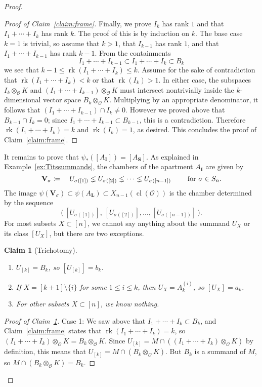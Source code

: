 \documentclass[11 pt]{article}
\theoremstyle{plain}
\newtheorem{claims}{Claim}
\theoremstyle{definition}
\numberwithin{equation}{section}
\renewcommand{\O}{\mathcal{O}}
\DeclareMathOperator{\class}{cl}
\newcommand\LL{\mathbf{L}}
\newcommand\II{\mathbf{I}}
\newcommand\VV{\mathbf{V}}
\newcommand\bS{\mathbf{S}}
\newcommand\coloneq{\mathrel{\mathop:}\mkern-1.2mu=}
\newcommand\tensor{\otimes}
\DeclareMathOperator{\Rank}{rk}
\newcommand{\change}{}
\begin{document}
\begin{proof}
\begin{proof}[Proof of Claim~\ref{claim:frame}]
Finally, we prove $I_k$ has rank $1$ and that $I_1 + \cdots + I_k$ has rank $k$.  The proof of this
is by induction on $k$.  The base case $k=1$ is trivial, so assume that $k>1$, that $I_{k-1}$ has rank $1$,
and that $I_1 + \cdots + I_{k-1}$ has rank $k-1$.
From the containments
\[I_1+\cdots+I_{k-1}\subset I_1+\cdots+I_k\subset B_k\]
we see that $k-1\leq \Rank(I_1+\cdots+I_k)\leq k$. Assume for the sake of contradiction that $\Rank(I_1+\cdots+I_k)<k$ 
or that $\Rank(I_k)>1$.  In either case, the subspaces  $I_k\tensor_\O K$ and $(I_1+\cdots+I_{k-1})\tensor_\O K$  must intersect nontrivially inside the $k$-dimensional vector space $B_k\tensor_\O K$. Multiplying by an appropriate denominator, it follows that $(I_1+\cdots+I_{k-1})\cap I_k\neq 0$. However we proved above that $B_{k-1}\cap I_k=0$; since $I_1+\cdots+I_{k-1}\subset B_{k-1}$, this is a contradiction. Therefore $\Rank(I_1+\cdots+I_k)=k$ and $\Rank(I_k)=1$, as desired. This concludes the proof of Claim~\ref{claim:frame}.
\end{proof}

It remains to prove that $\psi_{\ast}([A_{\II}]) = [A_{\bS}]$.  As explained in Example~\ref{ex:Titssummands},
the chambers of the apartment $A_\II$ are given by
\[\VV_\sigma\coloneq\quad U_{\sigma([1])}\lneq U_{\sigma([2])}\lneq\cdots\lneq U_{\sigma([n-1])}\qquad\text{ for }\sigma\in S_n.\]
The image $\psi(\VV_\sigma)\subset \psi(A_\LL)\subset X_{n-1}(\class(\O))$ is the 
chamber determined by the sequence
\[\big(\,[U_{\sigma([1])}],\,[U_{\sigma([2])}],\ldots,[U_{\sigma([n-1])}]\,\big).\]%
For most subsets $X\subset [n]$, we cannot say anything about the summand $U_X$ or its 
class $[U_X]$, but there are two exceptions.
\begin{claims}[Trichotomy]
\label{claim:trichotomy}\ \change

\begin{enumerate}[label={\normalfont \arabic*.},topsep=3pt,itemsep=2pt,parsep=2pt]
\item $U_{[k]} = B_k$, so $[U_{[k]}] = b_k$.  
\item If $X = [k+1] \setminus \{i\}$ for some $1 \leq i \leq k$, then
$U_X = A_k^{(i)}$, so $[U_X]=a_k$.
\item For other subsets $X\subset [n]$, we know nothing.
\end{enumerate}
\end{claims}
\begin{proof}[Proof of Claim~\ref{claim:trichotomy}]
Case 1: We saw above that $I_1+\cdots+I_k\subset B_k$, and Claim~\ref{claim:frame} states that $\Rank(I_1+\cdots+I_k)=k$, so $(I_1+\cdots+I_k)\tensor_\O K=B_k\tensor_\O K$. Since $U_{[k]}=M\cap ((I_1+\cdots+I_k)\tensor_\O K)$ by definition, this means that $U_{[k]}=M\cap (B_k\tensor_\O K)$. But $B_k$ is a summand of $M$, so $M\cap (B_k\tensor_\O K)=B_k$.
 

\end{proof}
\end{proof}
\end{document}

